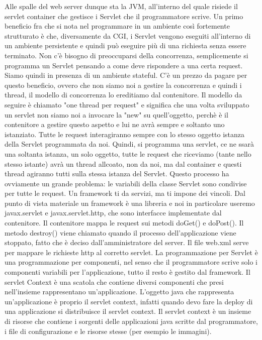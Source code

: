 Alle spalle del web server dunque sta la JVM, all'interno del quale risiede il servlet container che gestisce i Servlet che il programmatore scrive.\newline
Un primo beneficio fra che si nota nel programmare in un ambiente così fortemente strutturato è che, diversamente da CGI, i Servlet vengono eseguiti all'interno di un ambiente persistente e quindi può eseguire più di una richiesta senza essere terminato. Non c'è bisogno di preoccuparsi della concorrenza, semplicemente si programma un Servlet pensando a come deve rispondere a una certa request. Siamo quindi in presenza di un ambiente stateful. C'è un prezzo da pagare per questo beneficio, ovvero che non siamo noi a gestire la concorrenza e quindi i thread, il modello di concorrenza lo ereditiamo dal contenitore. Il modello da seguire è chiamato "one thread per request" e significa che una volta sviluppato un servlet non siamo noi a invocare la "new" su quell'oggetto, perchè è il contenitore a gestire questo aspetto e lui ne avrà sempre e soltanto uno istanziato. Tutte le request interagiranno sempre con lo stesso oggetto istanza della Servlet programmata da noi. Quindi, si programma una servlet, ce ne ssarà una soltanta istanza, un solo oggetto, tutte le request che riceviamo (tante nello stesso istante) avrà un thread allcoato, non da noi, ma dal container e questi thread agiranno tutti sulla stessa istanza del Servlet. Questo processo ha ovviamente un grande problema: le variabili della classe Servlet sono condivise per tutte le request.\newline
Un framework ti da servizi, ma ti impone dei vincoli.\newline
Dal punto di vista materiale un framework è una libreria e noi in particolare useremo javax.servlet e javax.servlet.http, che sono interfacce implementate dal contenitore.\newline
Il contenitore mappa le request sui metodi doGet() e doPost().\newline
Il metodo destroy() viene chiamato quando il processo dell'applicazione viene stoppato, fatto che è deciso dall'amministratore del server.\newline
Il file web.xml serve per mappare le richieste http al corretto servlet.\newline
La programmazione per Servlet è una programmazione per componenti, nel senso che il programmatore scrive solo i componenti variabili per l'applicazione, tutto il resto è gestito dal framework.\newline
Il servlet Context è una scatola che contiene diversi componenti che presi nell'insieme rappresentano un'applicazione. L'oggetto java che rappresenta un'applicazione è proprio il servlet context, infatti quando devo fare la deploy di una applicazione si distribuisce il servlet context. Il servlet context è un insieme di risorse che contiene i sorgenti delle applicazioni java scritte dal programmatore, i file di configurazione e le risorse stesse (per esempio le immagini).\newline
